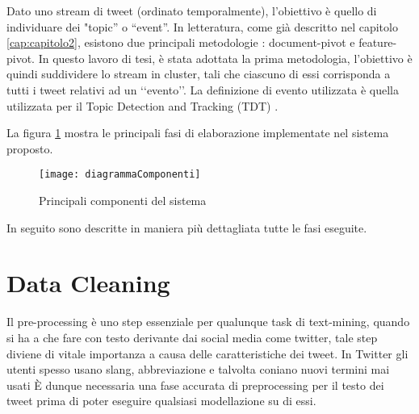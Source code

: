 

Dato uno stream  di tweet (ordinato temporalmente), l'obiettivo  è quello di individuare dei "topic” o “event”. In letteratura, come già descritto nel capitolo \ref{cap:capitolo2}, esistono due principali metodologie : document-pivot e feature-pivot.
In questo lavoro di tesi, è stata adottata la prima metodologia, l'obiettivo è quindi suddividere lo stream in cluster, tali che ciascuno di essi corrisponda a tutti i tweet relativi ad un \lq\lq evento\rq\rq.  
La definizione di evento utilizzata è quella utilizzata per il Topic Detection and Tracking (TDT) \cite{Allan:2002:TDT:772260}.


La figura \ref{fig:diagrammaComponentiSistema} mostra le principali fasi di elaborazione implementate  nel sistema proposto.
\begin{figure}[h]
    \centering
    \texttt{[image: diagrammaComponenti]}
    \caption{Principali componenti del sistema}
    \label{fig:diagrammaComponentiSistema}
\end{figure} 
 In seguito sono descritte in maniera più dettagliata tutte le fasi eseguite.


\section{Data Cleaning}

Il pre-processing è uno step essenziale per qualunque task di text-mining, quando si ha a che fare con testo derivante dai social media come twitter, tale step diviene di vitale importanza a causa delle caratteristiche dei tweet. In Twitter gli utenti spesso usano slang, abbreviazione e talvolta coniano nuovi termini mai usati 
\`E dunque necessaria una fase accurata di preprocessing per il testo dei tweet prima di poter eseguire qualsiasi modellazione su di essi. 

